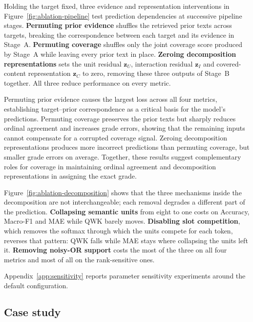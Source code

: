 Holding the target fixed, three evidence and representation interventions
in Figure~\ref{fig:ablation-pipeline} test prediction dependencies at successive
pipeline stages.
\textbf{Permuting prior evidence} shuffles the retrieved prior texts across
targets, breaking the correspondence between each target and its evidence in
Stage~A. \textbf{Permuting coverage} shuffles only the joint coverage score
produced by Stage~A while leaving every prior text in place.
\textbf{Zeroing decomposition representations} sets the unit residual $\boldsymbol{z}_U$,
interaction residual $\boldsymbol{z}_I$ and covered-content representation
$\boldsymbol{z}_C$ to zero, removing these three outputs of Stage~B
together. All three reduce performance on
every metric.

Permuting prior evidence causes the largest loss across all four metrics,
establishing target--prior correspondence as a critical basis for the model's
predictions. Permuting coverage preserves the prior texts but sharply reduces
ordinal agreement and increases grade errors, showing that the remaining inputs
cannot compensate for a corrupted coverage signal. Zeroing decomposition
representations produces more incorrect predictions than permuting coverage,
but smaller grade errors on average. Together, these
results suggest complementary roles for coverage in maintaining ordinal
agreement and decomposition representations in assigning the exact grade.

Figure~\ref{fig:ablation-decomposition} shows that the three mechanisms inside
the decomposition are not interchangeable; each removal degrades a different
part of the prediction.
\textbf{Collapsing semantic units} from eight to one costs on Accuracy, Macro-F1
and MAE while QWK barely moves.
\textbf{Disabling slot competition}, which removes the softmax through which the
units compete for each token, reverses that pattern: QWK falls while MAE stays
where collapsing the units left it.
\textbf{Removing noisy-OR support} costs the most of the three on all four
metrics and most of all on the rank-sensitive ones.

Appendix~\ref{app:sensitivity} reports parameter sensitivity experiments around
the default configuration.

\subsection{Case study}
\label{sec:exp-case}

